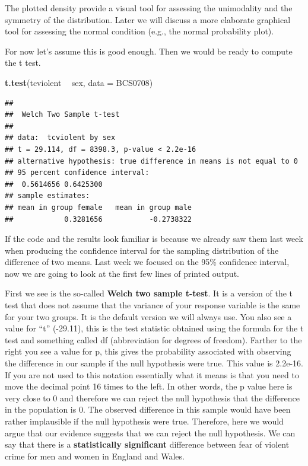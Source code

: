 \documentclass[]{book}
\newenvironment{Shaded}{\begin{snugshade}}{\end{snugshade}}
\newcommand{\DataTypeTok}[1]{\textcolor[rgb]{0.13,0.29,0.53}{#1}}
\newcommand{\KeywordTok}[1]{\textcolor[rgb]{0.13,0.29,0.53}{\textbf{#1}}}
\newcommand{\NormalTok}[1]{#1}
\newcommand{\OperatorTok}[1]{\textcolor[rgb]{0.81,0.36,0.00}{\textbf{#1}}}
\newcommand{\StringTok}[1]{\textcolor[rgb]{0.31,0.60,0.02}{#1}}
\theoremstyle{definition}
\theoremstyle{definition}
\theoremstyle{definition}
\theoremstyle{remark}
\begin{document}
The plotted density provide a visual tool for assessing the unimodality
and the symmetry of the distribution. Later we will discuss a more
elaborate graphical tool for assessing the normal condition (e.g., the
normal probability plot).

For now let's assume this is good enough. Then we would be ready to
compute the t test.

\begin{Shaded}
\begin{Highlighting}[]
\KeywordTok{t.test}\NormalTok{(tcviolent }\OperatorTok{~}\StringTok{ }\NormalTok{sex, }\DataTypeTok{data =}\NormalTok{ BCS0708)}
\end{Highlighting}
\end{Shaded}

\begin{verbatim}
## 
##  Welch Two Sample t-test
## 
## data:  tcviolent by sex
## t = 29.114, df = 8398.3, p-value < 2.2e-16
## alternative hypothesis: true difference in means is not equal to 0
## 95 percent confidence interval:
##  0.5614656 0.6425300
## sample estimates:
## mean in group female   mean in group male 
##            0.3281656           -0.2738322
\end{verbatim}

If the code and the results look familiar is because we already saw them
last week when producing the confidence interval for the sampling
distribution of the difference of two means. Last week we focused on the
95\% confidence interval, now we are going to look at the first few
lines of printed output.

First we see is the so-called \textbf{Welch two sample t-test}. It is a
version of the t test that does not assume that the variance of your
response variable is the same for your two groups. It is the default
version we will always use. You also see a value for ``t'' (-29.11),
this is the test statistic obtained using the formula for the t test and
something called df (abbreviation for degrees of freedom). Farther to
the right you see a value for p, this gives the probability associated
with observing the difference in our sample if the null hypothesis were
true. This value is 2.2e-16. If you are not used to this notation
essentially what it means is that you need to move the decimal point 16
times to the left. In other words, the p value here is very close to 0
and therefore we can reject the null hypothesis that the difference in
the population is 0. The observed difference in this sample would have
been rather implausible if the null hypothesis were true. Therefore,
here we would argue that our evidence suggests that we can reject the
null hypothesis. We can say that there is a \textbf{statistically
significant} difference between fear of violent crime for men and women
in England and Wales.
\end{document}
